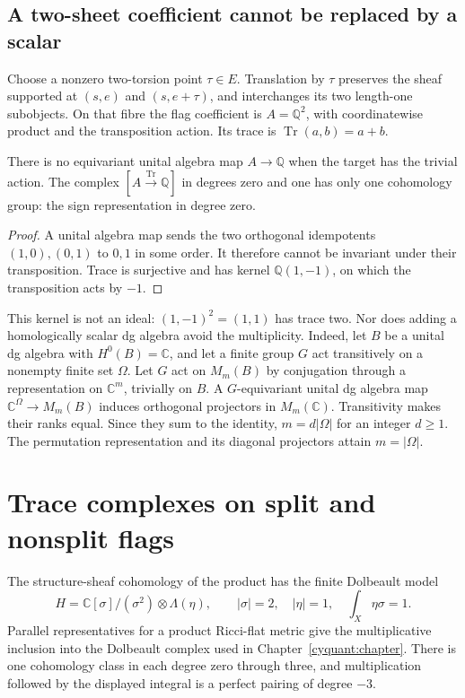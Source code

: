 \subsection{A two-sheet coefficient cannot be replaced by a scalar}

Choose a nonzero two-torsion point $\tau\in E$. Translation by
$\tau$ preserves the sheaf supported at $(s,e)$ and $(s,e+\tau)$,
and interchanges its two length-one subobjects. On that fibre
the flag coefficient is $A=\mathbb Q^2$, with coordinatewise
product and the transposition action. Its trace is
$\operatorname{Tr}(a,b)=a+b$.

\begin{proposition}\label{cycompact:prop:two-sheet}
There is no equivariant unital algebra map $A\to\mathbb Q$ when
the target has the trivial action. The complex
$[A\xrightarrow{\operatorname{Tr}}\mathbb Q]$ in degrees zero
and one has only one cohomology group: the sign representation
in degree zero.
\end{proposition}

\begin{proof}
A unital algebra map sends the two orthogonal idempotents
$(1,0),(0,1)$ to $0,1$ in some order. It therefore cannot be
invariant under their transposition. Trace is surjective and
has kernel $\mathbb Q(1,-1)$, on which the transposition acts
by $-1$.
\end{proof}

This kernel is not an ideal: $(1,-1)^2=(1,1)$ has trace two.
Nor does adding a homologically scalar dg algebra avoid the
multiplicity. Indeed, let $B$ be a unital dg algebra with
$H^0(B)=\mathbb C$, and let a finite group $G$ act transitively
on a nonempty finite set $\Omega$. Let $G$ act on $M_m(B)$ by
conjugation through a representation on $\mathbb C^m$, trivially
on $B$. A $G$-equivariant unital dg algebra map
$\mathbb C^\Omega\to M_m(B)$ induces orthogonal projectors in
$M_m(\mathbb C)$. Transitivity makes their ranks equal. Since
they sum to the identity, $m=d|\Omega|$ for an integer $d\geq1$.
The permutation representation and its diagonal projectors
attain $m=|\Omega|$.

\section{Trace complexes on split and nonsplit flags}
\label{cycompact:sec:trace}

The structure-sheaf cohomology of the product has the finite
Dolbeault model
\begin{equation}\label{cycompact:eq:scalar-model}
 H=\mathbb C[\sigma]/(\sigma^2)\otimes\Lambda(\eta),
 \qquad |\sigma|=2,\quad |\eta|=1,\quad
 \int_X\eta\sigma=1.
\end{equation}
Parallel representatives for a product Ricci-flat metric give
the multiplicative inclusion into the Dolbeault complex used in
Chapter~\ref{cyquant:chapter}. There is one cohomology class in
each degree zero through three, and multiplication followed by
the displayed integral is a perfect pairing of degree $-3$.

